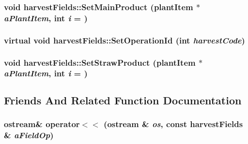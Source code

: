 \label{classharvest_fields_a0d164d1fd85c0c4545fa90d92f5c00ea}
\hypertarget{classharvest_fields_abf0a1c96f2c3fd07843970bc1c4ae157}{
\subsubsection[{SetMainProduct}]{\setlength{\rightskip}{0pt plus 5cm}void harvestFields::SetMainProduct ({\bf plantItem} $\ast$ {\em aPlantItem}, \/  int {\em i} = {})}}
\label{classharvest_fields_abf0a1c96f2c3fd07843970bc1c4ae157}
\hypertarget{classharvest_fields_abe2ee717c2495800b8ad75d9d7382b7b}{
\subsubsection[{SetOperationId}]{\setlength{\rightskip}{0pt plus 5cm}virtual void harvestFields::SetOperationId (int {\em harvestCode})}}
\label{classharvest_fields_abe2ee717c2495800b8ad75d9d7382b7b}
\hypertarget{classharvest_fields_ae88064e2d377dc620294bf23ef43efa4}{
\subsubsection[{SetStrawProduct}]{\setlength{\rightskip}{0pt plus 5cm}void harvestFields::SetStrawProduct ({\bf plantItem} $\ast$ {\em aPlantItem}, \/  int {\em i} = {})}}
\label{classharvest_fields_ae88064e2d377dc620294bf23ef43efa4}


\subsection{Friends And Related Function Documentation}
\hypertarget{classharvest_fields_a0aea28a5f5ab32df57a2204cce6cd04b}{
\subsubsection[{operator$<$$<$}]{\setlength{\rightskip}{0pt plus 5cm}ostream\& operator$<$$<$ (ostream \& {\em os}, \/  const {\bf harvestFields} \& {\em aFieldOp})}}
\label{classharvest_fields_a0aea28a5f5ab32df57a2204cce6cd04b}


